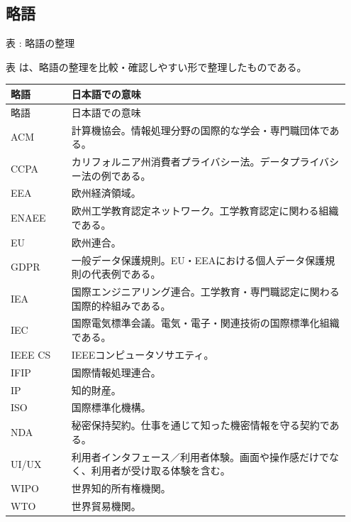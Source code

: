 \subsection*{略語}


\begin{center}
\small
\par\smallskip\noindent{}\label{tab:ch14-02}表 \thetable: 略語の整理\par\smallskip
表 \thetable は、略語の整理を比較・確認しやすい形で整理したものである。\par\smallskip
\begin{longtable}{p{0.17\linewidth}p{0.78\linewidth}}
\toprule
略語 & 日本語での意味 \\
\midrule
\endfirsthead
\toprule
略語 & 日本語での意味 \\
\midrule
\endhead
ACM & 計算機協会。情報処理分野の国際的な学会・専門職団体である。 \\
\midrule
CCPA & カリフォルニア州消費者プライバシー法。データプライバシー法の例である。 \\
\midrule
EEA & 欧州経済領域。 \\
\midrule
ENAEE & 欧州工学教育認定ネットワーク。工学教育認定に関わる組織である。 \\
\midrule
EU & 欧州連合。 \\
\midrule
GDPR & 一般データ保護規則。EU・EEAにおける個人データ保護規則の代表例である。 \\
\midrule
IEA & 国際エンジニアリング連合。工学教育・専門職認定に関わる国際的枠組みである。 \\
\midrule
IEC & 国際電気標準会議。電気・電子・関連技術の国際標準化組織である。 \\
\midrule
IEEE CS & IEEEコンピュータソサエティ。 \\
\midrule
IFIP & 国際情報処理連合。 \\
\midrule
IP & 知的財産。 \\
\midrule
ISO & 国際標準化機構。 \\
\midrule
NDA & 秘密保持契約。仕事を通じて知った機密情報を守る契約である。 \\
\midrule
UI/UX & 利用者インタフェース／利用者体験。画面や操作感だけでなく、利用者が受け取る体験を含む。 \\
\midrule
WIPO & 世界知的所有権機関。 \\
\midrule
WTO & 世界貿易機関。 \\
\midrule
\bottomrule
\end{longtable}
\normalsize
\end{center}
